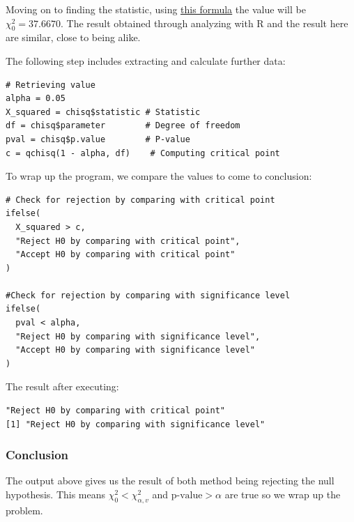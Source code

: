\documentclass[a4paper]{article}
\numberwithin{equation}{section}
\begin{document}
Moving on to finding the statistic, using \hyperref[chi:stat]{\underline{this formula}} the value will be \( \chi_0^2 = 37.6670\). The result obtained through analyzing with R and the result here are similar, close to being alike.

The following step includes extracting and calculate further data:
\begin{mdframed}[leftline=false,rightline=false,backgroundcolor=magenta!10,nobreak=true]
  \begin{verbatim}
# Retrieving value
alpha = 0.05
X_squared = chisq$statistic # Statistic
df = chisq$parameter        # Degree of freedom
pval = chisq$p.value        # P-value
c = qchisq(1 - alpha, df)    # Computing critical point
  \end{verbatim}
\end{mdframed}

To wrap up the program, we compare the values to come to conclusion:
\begin{mdframed}[leftline=false,rightline=false,backgroundcolor=magenta!10,nobreak=true]
  \begin{verbatim}
# Check for rejection by comparing with critical point
ifelse(
  X_squared > c,
  "Reject H0 by comparing with critical point",
  "Accept H0 by comparing with critical point"
)

#Check for rejection by comparing with significance level
ifelse(
  pval < alpha,
  "Reject H0 by comparing with significance level",
  "Accept H0 by comparing with significance level"
)
  \end{verbatim}
\end{mdframed}

The result after executing:
\begin{mdframed}[leftline=false,rightline=false,backgroundcolor=teal!10,nobreak=true]
  \begin{verbatim}
"Reject H0 by comparing with critical point"
[1] "Reject H0 by comparing with significance level"
  \end{verbatim}
\end{mdframed}

\subsubsection{Conclusion}
The output above gives us the result of both method being rejecting the null hypothesis. This means \(\chi_0^2 < \chi_{\alpha, v}^2\) and \(\text{p-value} > \alpha \) are true so we wrap up the problem.
\end{document}
